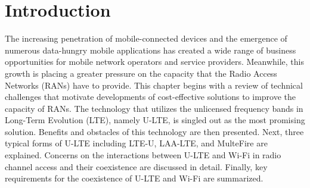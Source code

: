 %
%
%
\chapter{Introduction}
\label{intro} 


The increasing penetration of mobile-connected devices and the emergence of numerous data-hungry mobile applications has created a wide range of business opportunities for mobile network operators and service providers. Meanwhile, this growth is placing a greater pressure on the capacity that the Radio Access Networks (RANs) have to provide. This chapter begins with a review of technical challenges that motivate developments of cost-effective solutions to improve the capacity of RANs. The technology that utilizes the unlicensed frequency bands in Long-Term Evolution (LTE), namely \mbox{U-LTE}, is singled out as the most promising solution. Benefits and obstacles of this technology are then presented. Next, three typical forms of \mbox{U-LTE} including \mbox{LTE-U}, \mbox{LAA-LTE}, and MulteFire are explained. Concerns on the interactions between \mbox{U-LTE} and \mbox{Wi-Fi} in radio channel access and their coexistence are discussed in detail. Finally, key requirements for the coexistence of \mbox{U-LTE} and \mbox{Wi-Fi} are summarized.


